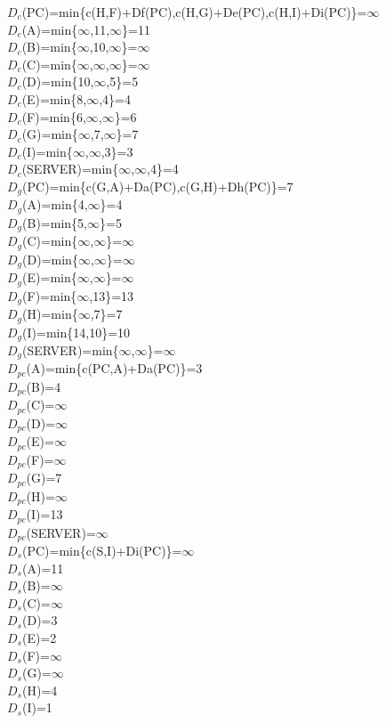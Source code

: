 \documentclass{article}
\begin{document}
$D_c$(PC)=min\{c(H,F)+Df(PC),c(H,G)+De(PC),c(H,I)+Di(PC)\}=$\infty$\\
$D_c$(A)=min\{$\infty$,11,$\infty$\}=11\\
$D_c$(B)=min\{$\infty$,10,$\infty$\}=$\infty$\\
$D_c$(C)=min\{$\infty$,$\infty$,$\infty$\}=$\infty$\\
$D_c$(D)=min\{10,$\infty$,5\}=5\\
$D_c$(E)=min\{8,$\infty$,4\}=4\\
$D_c$(F)=min\{6,$\infty$,$\infty$\}=6\\
$D_c$(G)=min\{$\infty$,7,$\infty$\}=7\\
$D_c$(I)=min\{$\infty$,$\infty$,3\}=3\\
$D_c$(SERVER)=min\{$\infty$,$\infty$,4\}=4\\

$D_g$(PC)=min\{c(G,A)+Da(PC),c(G,H)+Dh(PC)\}=7\\
$D_g$(A)=min\{4,$\infty$\}=4\\
$D_g$(B)=min\{5,$\infty$\}=5\\
$D_g$(C)=min\{$\infty$,$\infty$\}=$\infty$\\
$D_g$(D)=min\{$\infty$,$\infty$\}=$\infty$\\
$D_g$(E)=min\{$\infty$,$\infty$\}=$\infty$\\
$D_g$(F)=min\{$\infty$,13\}=13\\
$D_g$(H)=min\{$\infty$,7\}=7\\
$D_g$(I)=min\{14,10\}=10\\
$D_g$(SERVER)=min\{$\infty$,$\infty$\}=$\infty$\\

$D_{pc}$(A)=min\{c(PC,A)+Da(PC)\}=3\\
$D_{pc}$(B)=4\\
$D_{pc}$(C)=$\infty$\\
$D_{pc}$(D)=$\infty$\\
$D_{pc}$(E)=$\infty$\\
$D_{pc}$(F)=$\infty$\\
$D_{pc}$(G)=7\\
$D_{pc}$(H)=$\infty$\\
$D_{pc}$(I)=13\\
$D_{pc}$(SERVER)=$\infty$\\

$D_s$(PC)=min\{c(S,I)+Di(PC)\}=$\infty$\\
$D_s$(A)=11\\
$D_s$(B)=$\infty$\\
$D_s$(C)=$\infty$\\
$D_s$(D)=3\\
$D_s$(E)=2\\
$D_s$(F)=$\infty$\\
$D_s$(G)=$\infty$\\
$D_s$(H)=4\\
$D_s$(I)=1\\\\\\
\end{document}
